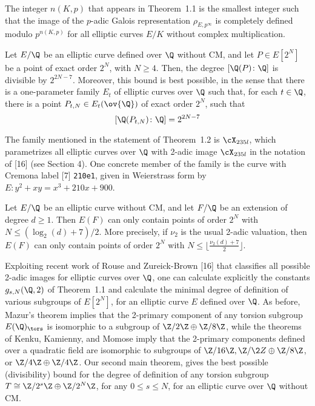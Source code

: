 The integer $n(K,p)$ that appears in Theorem~1.1 is the smallest integer such that the image of the $p$-adic Galois representation $\rho_{E,p^\infty}$ is completely defined modulo $p^{n(K,p)}$ for all elliptic curves $E/K$ without complex multiplication. 


\begin{thm} %
Let $E/\Q$ be an elliptic curve defined over $\Q$ without CM, and let $P \in E[2^N]$ be a point of exact order $2^N$, with $N \geq 4$. Then, the degree $[\Q(P) \colon \Q]$ is divisible by $2^{2N - 7}$. Moreover, this bound is best possible, in the sense that there is a one-parameter family $E_t$ of elliptic curves over $\Q$ such that, for each $t \in \Q$, there is a point $P_{t,N} \in E_t(\ov{\Q})$ of exact order $2^N$, such that
	\[
	[\Q(P_{t,N}) \colon \Q]= 2^{2N - 7}
	\]
\end{thm}


The family mentioned in the statement of Theorem~1.2 is $\cX_{235l}$, which parametrizes all elliptic curves over $\Q$ with 2-adic image $\cX_{235l}$ in the notation of [16] (see Section 4). One concrete member of the family is the curve with Cremona label [7] \texttt{210e1}, given in Weierstrass form by $E \colon y^2 + xy = x^3 + 210x + 900$.


\begin{cor} %
Let $E/\Q$ be an elliptic curve without CM, and let $F/\Q$ be an extension of degree $d \geq 1$. Then $E(F)$ can only contain points of order $2^N$ with $N \leq (\log_2(d) + 7)/2$. More precisely, if $\nu_2$ is the usual 2-adic valuation, then $E(F)$ can only contain points of order $2^N$ with $N \leq \lfloor \frac{\nu_2(d) + 7}{2} \rfloor$. 
\end{cor}


Exploiting recent work of Rouse and Zureick-Brown [16] that classifies all possible 2-adic images for elliptic curves over $\Q$, one can calculate explicitly the constants $g_{s,N}(\Q,2)$ of Theorem~1.1 and calculate the minimal degree of definition of various subgroups of $E[2^N]$, for an elliptic curve $E$ defined
over $\Q$. As before, Mazur’s theorem implies that the 2-primary component of any torsion subgroup $E(\Q)_\tors$ is isomorphic to a subgroup of $\Z/2\Z \oplus \Z/8\Z$, while the theorems of Kenku, Kamienny, and Momose imply that the 2-primary components defined over a quadratic field are isomorphic to subgroups of $\Z/16\Z, \Z/\2Z \oplus \Z/8\Z$, or $\Z/4\Z \oplus \Z/4\Z$. Our second main theorem, gives the best
possible (divisibility) bound for the degree of definition of any torsion subgroup $T \cong \Z/2^s\Z \oplus \Z/2^N\Z$, for any $0 \leq s \leq N$, for an elliptic curve over $\Q$ without CM.


